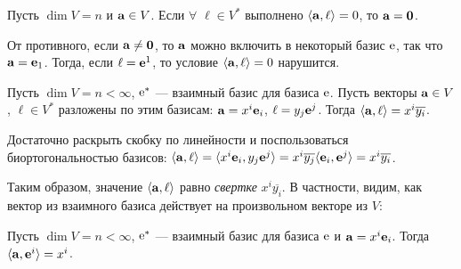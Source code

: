 \begin{sled}\label{p8_4_00}
Пусть $\dim V = n$ и $\mathbf{a}\in V$. Если $\forall$ $\ell \in V^{*}$ выполнено
$\langle \mathbf{a}, \ell \rangle = 0$, то $\mathbf{a} =  \mathbf{0}$.
\end{sled}
\dok От противного, если $\mathbf{a} \neq  \mathbf{0}$, то $\mathbf{a}$ можно включить в некоторый базис $\mathrm{e}$, 
так что $\mathbf{a} =  \mathbf{e}_1$. Тогда, если $\ell = \mathbf{e}^1$, то
условие $\langle \mathbf{a}, \ell \rangle = 0$ нарушится.
\edok



\begin{predl}\label{p8_4_0}
Пусть $\dim V = n<\infty$, $\mathrm{e}^*$ --- взаимный базис для базиса $\mathrm{e}$. Пусть
векторы $\mathbf{a}\in V$, $\ell \in V^{*}$ разложены по этим базисам:
$\mathbf{a} = x^i\mathbf{e}_i$, $\ell = y_j\mathbf{e}^j$. 
Тогда 
$  \langle \mathbf{a}, \ell \rangle = x^i\overline{y_i}$.
\end{predl}
\dok
Достаточно раскрыть скобку по линейности и поспользоваться биортогональностью базисов:
$  \langle \mathbf{a}, \ell \rangle = \langle  x^i\mathbf{e}_i, y_j\mathbf{e}^j \rangle  = 
x^i \overline{y_j} \langle  \mathbf{e}_i, \mathbf{e}^j \rangle= x^i\overline{y_i}$.
\edok

\otstup

Таким образом,  значение $\langle \mathbf{a}, \ell \rangle$ равно {\it свертке} $x^i\overline{y_i}$.
В частности, видим, как вектор из взаимного базиса действует на произвольном векторе из $V$:

\begin{sled}\label{s8_4_0}
Пусть $\dim V = n<\infty$, $\mathrm{e}^*$ --- взаимный базис для базиса $\mathrm{e}$ и 
$\mathbf{a} = x^i\mathbf{e}_i$.
Тогда 
$  \langle \mathbf{a}, \mathbf{e}^i \rangle = x^i$.
\end{sled}


